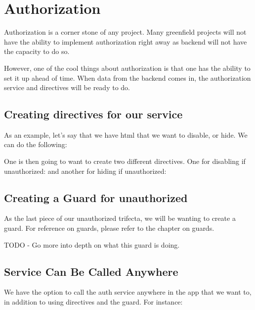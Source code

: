 \chapter{ Authorization }

Authorization is a corner stone of any project. Many greenfield projects will not have the ability to implement authorization right away as backend will not have the capacity to do so. 

However, one of the cool things about authorization is that one has the ability to set it up ahead of time. When data from the backend comes in, the authorization service and directives will be ready to do.

\section{Creating directives for our service}
As an example, let's say that we have html that we want to disable, or hide. We can do the following:


One is then going to want to create two different directives. One for disabling if unauthorized:  and another for hiding if unauthorized: 

\section{Creating a Guard for unauthorized}
As the last piece of our unauthorized trifecta, we will be wanting to create a guard. For reference on guards, please refer to the chapter on guards.

TODO - Go more into depth on what this guard is doing.


\section{Service Can Be Called Anywhere}
We have the option to call the auth service anywhere in the app that we want to, in addition to using directives and the guard. For instance:


